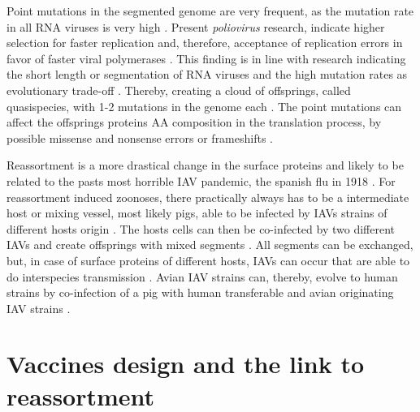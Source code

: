 \vspace{1em}

Point mutations in the segmented genome are very frequent, as the mutation rate in all RNA viruses is very high \autocite{duffy_why_2018}. Present \textit{poliovirus} research, indicate higher selection for faster replication and, therefore, acceptance of replication errors in favor of faster viral polymerases \autocite{pfeiffer_increased_2005, duffy_why_2018}. This finding is in line with research indicating the short length or segmentation of RNA viruses and the high mutation rates as evolutionary trade-off \autocite{belshaw_pacing_2008, vignuzzi_closing_2012}. Thereby, creating a cloud of offsprings, called quasispecies, with 1-2 mutations in the genome each \autocite{belshaw_pacing_2008, vignuzzi_closing_2012}. The point mutations can affect the offsprings proteins \gls{AA} composition in the translation process, by possible missense and nonsense errors or frameshifts \autocite{parker_errors_1989, webster_chapter_1999}. 

\FloatBarrier

Reassortment is a more drastical change in the surface proteins and likely to be related to the pasts most horrible \gls{IAV} pandemic, the spanish flu in 1918 \autocite{nelson_multiple_2008}. For reassortment induced zoonoses, there practically always has to be a intermediate host or \glqq mixing vessel\grqq{}, most likely pigs, able to be infected by \glspl{IAV} strains of different hosts origin \autocite{shu_evidence_1994}. The hosts cells can then be co-infected by two different \glspl{IAV} and create offsprings with mixed segments \autocite{compans_influenza_2014}. All segments can be exchanged, but, in case of surface proteins of different hosts, \glspl{IAV} can occur that are able to do interspecies transmission \autocite{shu_evidence_1994}. Avian \gls{IAV} strains can, thereby, evolve to human strains by co-infection of a pig with human transferable and avian originating \gls{IAV} strains \autocite{shu_evidence_1994}. 

\section{Vaccines design and the link to reassortment}

